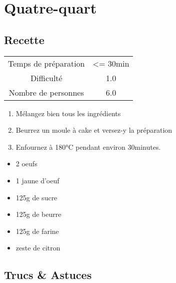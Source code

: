 \newpage
\section{Quatre-quart}
    \label{sec:Quatre-quart}
    \subsection{Recette}
    \vspace{1cm}


    \begin{center}
        \begin{tabular}{c|c}
            Temps de préparation & <= 30min \\
            Difficulté & 1.0 \\
            Nombre de personnes & 6.0 
        \end{tabular}
    \end{center}{}

    \vspace{1cm}
    \hline
    \vspace{1cm}

    \begin{minipage}{.7\textwidth}
        \begin{enumerate}
            \item Mélangez bien tous les ingrédients
	    \item Beurrez un moule à cake et versez-y la préparation
	    \item Enfournez à 180°C pendant environ 30minutes.

        \end{enumerate}
    \end{minipage}
    \begin{minipage}{.3\textwidth}
        \begin{flushleft}
        \begin{itemize}
            \item 2 oeufs
	    \item 1 jaune d'oeuf
	    \item 125g de sucre
	    \item 125g de beurre
	    \item 125g de farine
	    \item zeste de citron

        \end{itemize}
        \end{flushleft}
    \end{minipage}
    
    \vspace{1cm}
    \hline
    \vspace{1cm}
    
    \subsection{Trucs \& Astuces}
        
